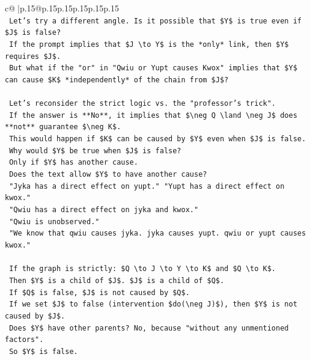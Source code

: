 \documentclass{article}
\begin{document}
{\begin{supertabular}{c@{$\;$}|p{.15\linewidth}@{}p{.15\linewidth}p{.15\linewidth}p{.15\linewidth}p{.15\linewidth}p{.15\linewidth}}
{{{\\ 
\texttt{        Let's try a different angle. Is it possible that \$Y\$ is true even if \$J\$ is false?} \\
\texttt{        If the prompt implies that \$J \textbackslash{}to Y\$ is the *only* link, then \$Y\$ requires \$J\$.} \\
\texttt{        But what if the "or" in "Qwiu or Yupt causes Kwox" implies that \$Y\$ can cause \$K\$ *independently* of the chain from \$J\$?} \\
\\ 
\texttt{        Let's reconsider the strict logic vs. the "professor's trick".} \\
\texttt{        If the answer is **No**, it implies that \$\textbackslash{}neg Q \textbackslash{}land \textbackslash{}neg J\$ does **not** guarantee \$\textbackslash{}neg K\$.} \\
\texttt{        This would happen if \$K\$ can be caused by \$Y\$ even when \$J\$ is false.} \\
\texttt{        Why would \$Y\$ be true when \$J\$ is false?} \\
\texttt{        Only if \$Y\$ has another cause.} \\
\texttt{        Does the text allow \$Y\$ to have another cause?} \\
\texttt{        "Jyka has a direct effect on yupt." "Yupt has a direct effect on kwox."} \\
\texttt{        "Qwiu has a direct effect on jyka and kwox."} \\
\texttt{        "Qwiu is unobserved."} \\
\texttt{        "We know that qwiu causes jyka. jyka causes yupt. qwiu or yupt causes kwox."} \\
\\ 
\texttt{        If the graph is strictly: \$Q \textbackslash{}to J \textbackslash{}to Y \textbackslash{}to K\$ and \$Q \textbackslash{}to K\$.} \\
\texttt{        Then \$Y\$ is a child of \$J\$. \$J\$ is a child of \$Q\$.} \\
\texttt{        If \$Q\$ is false, \$J\$ is not caused by \$Q\$.} \\
\texttt{        If we set \$J\$ to false (intervention \$do(\textbackslash{}neg J)\$), then \$Y\$ is not caused by \$J\$.} \\
\texttt{        Does \$Y\$ have other parents? No, because "without any unmentioned factors".} \\
\texttt{        So \$Y\$ is false.} \\
}}}
\end{supertabular}}
\end{document}
